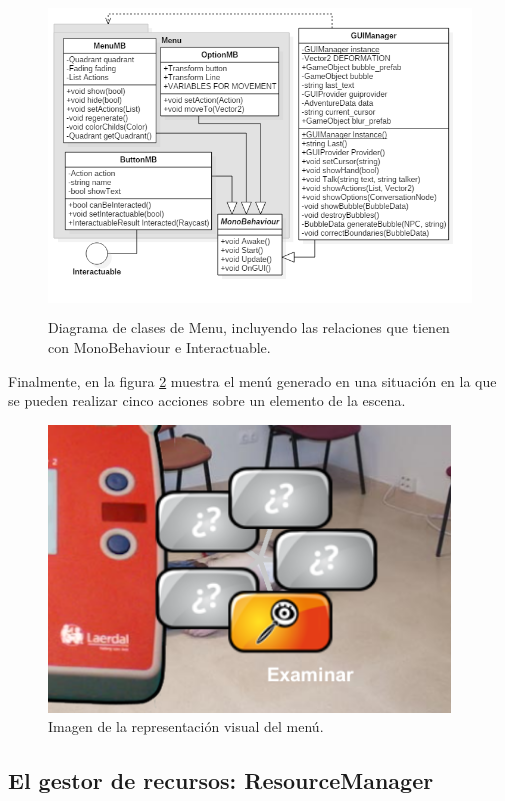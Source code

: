 \begin{figure}[h!]
	\centerline{\includegraphics[height=3.3in]{figures/it2/Menu.png}}
	\caption[Menu - Versión Final]{Diagrama de clases de Menu, incluyendo las relaciones que tienen con MonoBehaviour e Interactuable.}
	\label{menuit2}
\end{figure}

Finalmente, en la figura \ref{menuvisualit2} muestra el menú generado en una situación en la que se pueden realizar cinco acciones sobre un elemento de la escena. 

\begin{figure}[h!]
	\centerline{\includegraphics[height=3in]{figures/it2/apearance/menu.png}}
	\caption[Visual Menu - Versión Final]{Imagen de la representación visual del menú.}
	\label{menuvisualit2}
\end{figure}

\subsection{El gestor de recursos: ResourceManager}
\label{resourcemanager}

